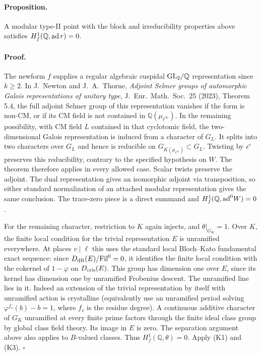 \paragraph{Proposition.}
A modular type-II point with the block and irreducibility properties
above satisfies \(H^1_f(\mathbb Q,{\rm ad}\,r)=0\).

\paragraph{Proof.}
The newform \(f\) supplies a regular algebraic cuspidal
\({\rm GL}_2/\mathbb Q\) representation since \(k\ge2\).
In J.\ Newton and J.\ A.\ Thorne, \emph{Adjoint Selmer groups of
automorphic Galois representations of unitary type},
J.\ Eur.\ Math.\ Soc.\ 25 (2023), Theorem 5.4, the full adjoint
Selmer group of this representation vanishes if the form is non-CM,
or if its CM field is not contained in \(\mathbb Q(\mu_{\ell^\infty})\).
In the remaining possibility, with CM field \(L\) contained in that
cyclotomic field, the two-dimensional Galois representation is
induced from a character of \(G_L\). It splits into two characters
over \(G_L\) and hence is reducible on
\(G_{K(\mu_{\ell^\infty})}\subset G_L\). Twisting by \(\epsilon^e\)
preserves this reducibility, contrary to the specified hypothesis on
\(W\). The theorem therefore applies in every allowed case. Scalar
twists preserve the adjoint. The dual representation gives an
isomorphic adjoint via transposition, so either standard normalization
of an attached modular representation gives the same conclusion.
The trace-zero piece is a direct summand and
\(H^1_f(\mathbb Q,{\rm ad}^0W)=0\).

For the remaining character, restriction to \(K\) again injects,
and \(\theta|_{G_K}=1\). Over \(K\), the finite local condition
for the trivial representation \(E\) is unramified everywhere.
At places \(v\mid\ell\) this uses the standard local Bloch--Kato
fundamental exact sequence: since
\(D_{\rm dR}(E)/{\rm Fil}^0=0\), it identifies the finite local condition
with the cokernel of \(1-\varphi\) on \(D_{\rm cris}(E)\).
This group has dimension one over \(E\), since its kernel has
dimension one by unramified Frobenius descent. The unramified
line lies in it. Indeed an extension of the trivial representation
by itself with unramified action is crystalline (equivalently use
an unramified period solving \(\varphi^{f_v}(b)-b=1\), where
\(f_v\) is the residue degree).
A continuous additive character of \(G_K\) unramified at every
finite prime factors through the finite ideal class group by global
class field theory. Its image in \(E\) is zero. The separation
argument above also applies to \(B\)-valued classes. Thus
\(H^1_f(\mathbb Q,\theta)=0\). Apply (K1) and (K3). \(\square\)

